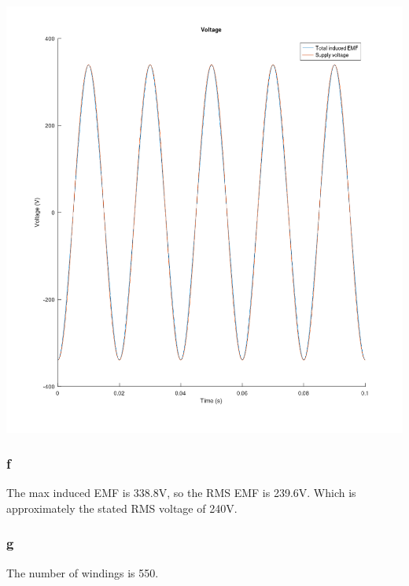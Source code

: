 \documentclass[11pt]{article}
\begin{document}
\begin{center}
\includegraphics[width=.9\linewidth]{ENG231-5.png}
\end{center}
\subsubsection{f}
\label{sec:org13d4733}
The max induced EMF is 338.8V, so the RMS EMF is 239.6V. Which is approximately the stated RMS voltage of 240V.
\subsubsection{g}
\label{sec:orgac47323}
The number of windings is 550.
\end{document}

